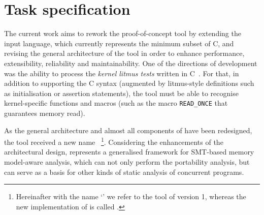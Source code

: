 

\section{Task specification}
\label{ch:intro:task}

The current work aims to rework the proof-of-concept tool \textit{\porthos{}} by extending the input language, which currently represents the minimum subset of C, and revising the general architecture of the tool in order to enhance performance, extensibility, reliability and maintainability.
One of the directions of development was the ability to process the \textit{kernel litmus tests} written in C~\cite{mckenney2017wg21}.
For that, in addition to supporting the C syntax (augmented by litmus-style definitions such as initialisation or assertion statements), the tool must be able to recognise kernel-specific functions and macros (such as the macro \texttt{READ\_ONCE} that guarantees memory read).

As the general architecture and almost all components of \porthos{} have been redesigned, the tool received a new name \textit{\porthos[2]}\,%
%
\footnote{Hereinafter with the name `\porthos{}' we refer to the tool \porthos{} of version 1, whereas the new implementation of \porthos{} is called \porthos[2].}. %
%
Considering the enhancements of the architectural design, \porthos[2] represents a generalised framework for SMT-based memory model-aware analysis, which can not only perform the portability analysis, but can serve as a basis for other kinds of static analysis of concurrent programs.


